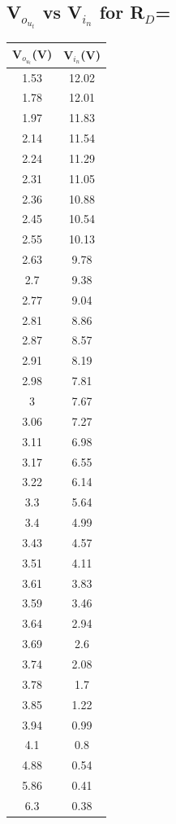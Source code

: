 \documentclass[12pt]{article}
\begin{document}
\subsection{ V$_o_u_t$ vs V$_i_n$ for R$_D$=}
\begin{center}
 \begin{tabular}{|| c | c||} 
 \hline
 V$_o_u_t$(V) &  V$_i_n$(V)\\ [0.5ex] 
 \hline\hline
 1.53 & 12.02 \\
\hline
1.78 & 12.01 \\
\hline
1.97 & 11.83 \\
\hline
2.14 & 11.54 \\
\hline
2.24 & 11.29 \\
\hline
2.31 & 11.05 \\
\hline
2.36 & 10.88 \\
\hline
2.45 & 10.54 \\
\hline
2.55 & 10.13 \\
\hline
2.63 & 9.78 \\
\hline
2.7 & 9.38 \\
\hline
2.77 & 9.04 \\
\hline
2.81 & 8.86 \\
\hline
2.87 & 8.57 \\
\hline
2.91 & 8.19 \\
\hline
2.98 & 7.81 \\
\hline
3 & 7.67 \\
\hline
3.06 & 7.27 \\
\hline
3.11 & 6.98 \\
\hline
3.17 & 6.55 \\
\hline
3.22 & 6.14 \\
\hline
3.3 & 5.64 \\
\hline
3.4 & 4.99 \\
\hline
3.43 & 4.57 \\
\hline
3.51 & 4.11 \\
\hline
3.61 & 3.83 \\
\hline
3.59 & 3.46 \\
\hline
3.64 & 2.94 \\
\hline
3.69 & 2.6 \\
\hline
3.74 & 2.08 \\
\hline
3.78 & 1.7 \\
\hline
3.85 & 1.22 \\
\hline
3.94 & 0.99 \\
\hline
4.1 & 0.8 \\
\hline
4.88 & 0.54 \\
\hline
5.86 & 0.41 \\
\hline
6.3 & 0.38 \\
\hline


\end{tabular}
\end{center}
\end{document}
